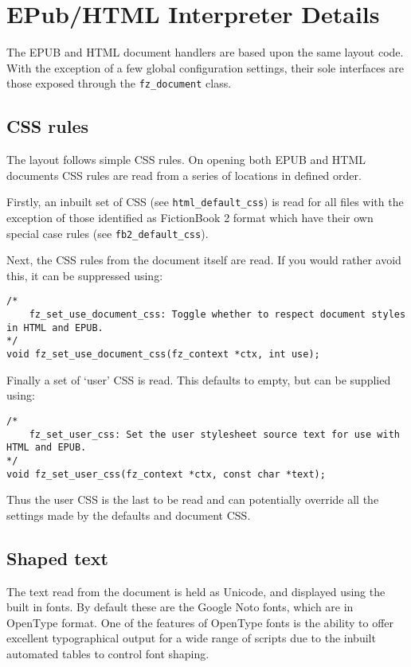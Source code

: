 \documentclass[oneside]{book}
\begin{document}
\chapter{EPub/HTML Interpreter Details}
\label{EPubInterpreter}

The EPUB and HTML document handlers are based upon the same layout code. With the exception of a few global configuration settings, their sole interfaces are those exposed through the \texttt{fz\_document} class.

\section{CSS rules}

The layout follows simple CSS rules. On opening both EPUB and HTML documents CSS rules are read from a series of locations in defined order.

Firstly, an inbuilt set of CSS (see \texttt{html\_default\_css}) is read for all files with the exception of those identified as FictionBook 2 format which have their own special case rules (see \texttt{fb2\_default\_css}).

Next, the CSS rules from the document itself are read. If you would rather avoid this, it can be suppressed using:

\begin{lstlisting}
/*
	fz_set_use_document_css: Toggle whether to respect document styles in HTML and EPUB.
*/
void fz_set_use_document_css(fz_context *ctx, int use);
\end{lstlisting}

Finally a set of `user' CSS is read. This defaults to empty, but can be supplied using:

\begin{lstlisting}
/*
	fz_set_user_css: Set the user stylesheet source text for use with HTML and EPUB.
*/
void fz_set_user_css(fz_context *ctx, const char *text);
\end{lstlisting}

Thus the user CSS is the last to be read and can potentially override all the settings made by the defaults and document CSS.

\section{Shaped text}

The text read from the document is held as Unicode, and displayed using the built in fonts. By default these are the Google Noto fonts, which are in OpenType format. One of the features of OpenType fonts is the ability to offer excellent typographical output for a wide range of scripts due to the inbuilt automated tables to control font shaping.
\end{document}
